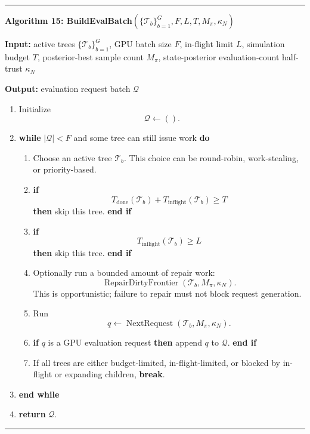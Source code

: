 \documentclass[11pt]{article}
\newcommand{\Tree}{\mathcal{T}}
\newcommand{\NextRequest}{\operatorname{NextRequest}}
\newcommand{\RepairDirtyFrontier}{\operatorname{RepairDirtyFrontier}}
\newenvironment{algorithmblock}[1]
{
  \par\medskip
  \noindent\hrule\par\smallskip
  \noindent\textbf{#1}
  \par\smallskip
}
{
  \par\smallskip\noindent\hrule\par\medskip
}
\newcommand{\Input}{\textbf{Input: }}
\newcommand{\Output}{\textbf{Output: }}
\newcommand{\Return}{\textbf{return }}
\newcommand{\If}{\textbf{if }}
\newcommand{\Then}{\textbf{ then }}
\newcommand{\EndIf}{\textbf{end if}}
\newcommand{\While}{\textbf{while }}
\newcommand{\EndWhile}{\textbf{end while}}
\newcommand{\Do}{\textbf{ do }}
\newcommand{\Break}{\textbf{break}}
\begin{document}
\begin{algorithmblock}{Algorithm 15: BuildEvalBatch\((\{\Tree_b\}_{b=1}^{G},F,L,T,M_\pi,\kappa_N)\)}

\Input active trees \(\{\Tree_b\}_{b=1}^{G}\), GPU batch size \(F\), in-flight limit \(L\), simulation budget \(T\), posterior-best sample count \(M_\pi\), state-posterior evaluation-count half-trust \(\kappa_N\)

\Output evaluation request batch \(\mathcal{Q}\)

\begin{enumerate}[leftmargin=2em]
  \item Initialize
  \[
  \mathcal{Q} \gets ().
  \]

  \item \While \(|\mathcal{Q}| < F\) and some tree can still issue work \Do

  \begin{enumerate}[leftmargin=2em]
    \item Choose an active tree \(\Tree_b\). This choice can be round-robin,
    work-stealing, or priority-based.

    \item \If
    \[
    T_{\mathrm{done}}(\Tree_b)+T_{\mathrm{inflight}}(\Tree_b) \ge T
    \]
    \Then skip this tree. \EndIf

    \item \If
    \[
    T_{\mathrm{inflight}}(\Tree_b) \ge L
    \]
    \Then skip this tree. \EndIf

    \item Optionally run a bounded amount of repair work:
    \[
    \RepairDirtyFrontier(\Tree_b,M_\pi,\kappa_N).
    \]
    This is opportunistic; failure to repair must not block request generation.

    \item Run
    \[
    q
    \gets
    \NextRequest(\Tree_b,M_\pi,\kappa_N).
    \]

    \item \If \(q\) is a GPU evaluation request \Then append \(q\) to
    \(\mathcal{Q}\). \EndIf

    \item If all trees are either budget-limited, in-flight-limited, or blocked
    by in-flight or expanding children, \Break.

  \end{enumerate}

  \item \EndWhile

  \item \Return \(\mathcal{Q}\).
\end{enumerate}

\end{algorithmblock}
\end{document}
